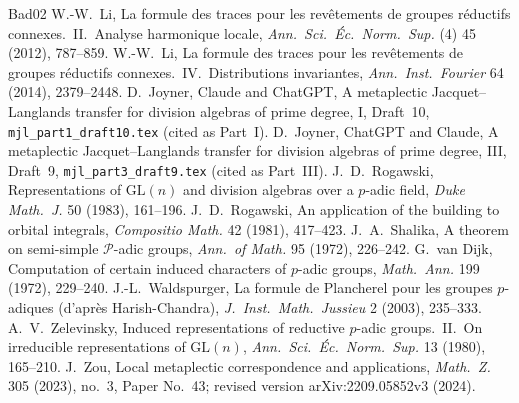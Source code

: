 \documentclass[12pt]{article}
\newcommand{\GL}{\mathrm{GL}}
\theoremstyle{plain}
\theoremstyle{definition}
\begin{document}
\begin{thebibliography}{Bad02}
 W.-W.~Li, La formule des traces pour les rev\^etements de groupes r\'eductifs connexes.\ II.\ Analyse harmonique locale, \emph{Ann.\ Sci.\ \'Ec.\ Norm.\ Sup.} (4) 45 (2012), 787--859.
 W.-W.~Li, La formule des traces pour les rev\^etements de groupes r\'eductifs connexes.\ IV.\ Distributions invariantes, \emph{Ann.\ Inst.\ Fourier} 64 (2014), 2379--2448.
 D.~Joyner, Claude and ChatGPT, A metaplectic Jacquet--Langlands transfer for division algebras of prime degree, I, Draft~10, \texttt{mjl\_part1\_draft10.tex} (cited as Part~I).
 D.~Joyner, ChatGPT and Claude, A metaplectic Jacquet--Langlands transfer for division algebras of prime degree, III, Draft~9, \texttt{mjl\_part3\_draft9.tex} (cited as Part~III).
 J.~D.~Rogawski, Representations of $\GL(n)$ and division algebras over a $p$-adic field, \emph{Duke Math.\ J.} 50 (1983), 161--196.
 J.~D.~Rogawski, An application of the building to orbital integrals, \emph{Compositio Math.} 42 (1981), 417--423.
 J.~A.~Shalika, A theorem on semi-simple $\mathcal P$-adic groups, \emph{Ann.\ of Math.} 95 (1972), 226--242.
 G.~van Dijk, Computation of certain induced characters of $p$-adic groups, \emph{Math.\ Ann.} 199 (1972), 229--240.
 J.-L.~Waldspurger, La formule de Plancherel pour les groupes $p$-adiques (d'apr\`es Harish-Chandra), \emph{J.\ Inst.\ Math.\ Jussieu} 2 (2003), 235--333.
 A.~V.~Zelevinsky, Induced representations of reductive $p$-adic groups.\ II.\ On irreducible representations of $\GL(n)$, \emph{Ann.\ Sci.\ \'Ec.\ Norm.\ Sup.} 13 (1980), 165--210.
 J.~Zou, Local metaplectic correspondence and applications, \emph{Math.\ Z.} 305 (2023), no.~3, Paper No.~43; revised version arXiv:2209.05852v3 (2024).
\end{thebibliography}
\end{document}
